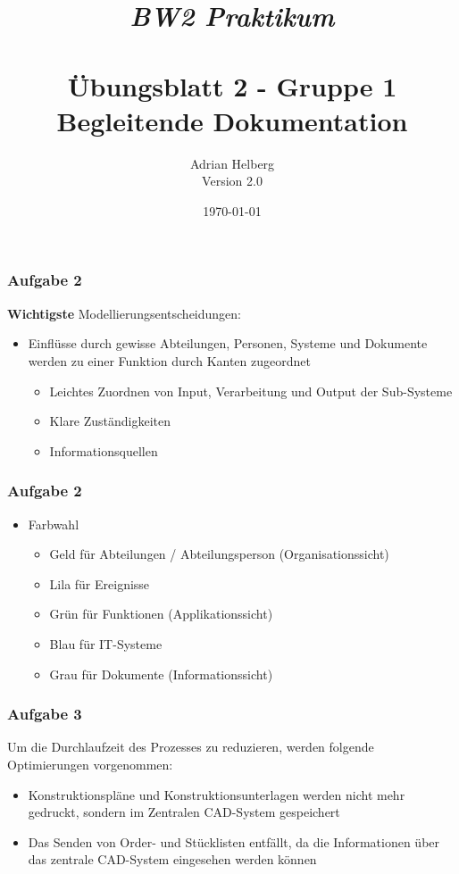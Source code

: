 \documentclass{beamer}
\title{
	\textit{BW2 Praktikum} \\
	\textbf{\\ \"Ubungsblatt 2 - Gruppe 1\\
	\scriptsize{Begleitende Dokumentation}}
}
\author{Adrian Helberg \\ Version 2.0}
\date{\today}
\begin{document}

\maketitle

\begin{frame}
\frametitle{Aufgabe 2}

\textbf{Wichtigste} Modellierungsentscheidungen:\\
\begin{itemize}
\item Einfl\"usse durch gewisse Abteilungen, Personen, Systeme und Dokumente werden zu einer Funktion durch Kanten zugeordnet
	\begin{itemize}
	\setlength\itemsep{1em}
	\item Leichtes Zuordnen von Input, Verarbeitung und Output der Sub-Systeme
	\item Klare Zust\"andigkeiten
	\item Informationsquellen
	\end{itemize}
\end{itemize}

\end{frame}

\begin{frame}
\frametitle{Aufgabe 2}

\begin{itemize}
\item Farbwahl
	\begin{itemize}
	\setlength\itemsep{1.6em}
	\item Geld f\"ur Abteilungen / Abteilungsperson (Organisationssicht)
	\item Lila f\"ur Ereignisse
	\item Gr\"un f\"ur Funktionen (Applikationssicht)
	\item Blau f\"ur IT-Systeme
	\item Grau f\"ur Dokumente (Informationssicht)
	\end{itemize}
\end{itemize}

\end{frame}

\begin{frame}
\frametitle{Aufgabe 3}

Um die Durchlaufzeit des Prozesses zu reduzieren, werden folgende Optimierungen vorgenommen:\\
\begin{itemize}
\setlength\itemsep{2em}
\item Konstruktionspl\"ane und Konstruktionsunterlagen werden nicht mehr gedruckt, sondern im Zentralen CAD-System gespeichert
\item Das Senden von Order- und Stücklisten entf\"allt, da die Informationen \"uber das zentrale CAD-System eingesehen werden k\"onnen
\end{itemize}

\end{frame}
\end{document}
